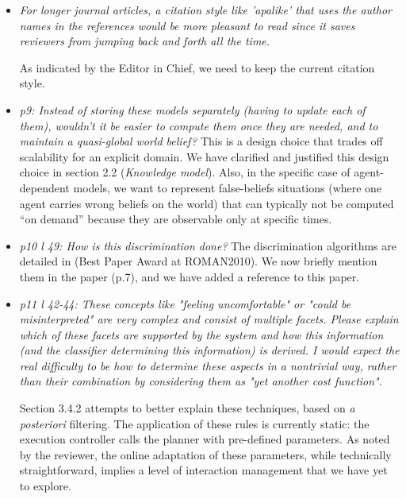 \documentclass{article}
\begin{document}
\begin{itemize}

    \item \emph{For longer journal articles, a citation style like 'apalike' that uses the
author names in the references would be more pleasant to read since it saves
reviewers from jumping back and forth all the time.}

As indicated by the Editor in Chief, we need to keep the current citation style.

    \item \emph{p9: Instead of storing these models separately (having to
    update each
of them), wouldn't it be easier to compute them once they are needed, and
to maintain a quasi-global world belief?} This is a design choice that trades
off scalability for an explicit domain. We have clarified and
justified this design choice in section 2.2 (\emph{Knowledge model}). Also, in
the specific case of agent-dependent models, we want to represent
false-beliefs situations (where one agent carries wrong beliefs on the world)
that can typically not be computed ``on demand'' because they are observable
only at specific times.

    \item \emph{p10 l 49: How is this discrimination done?} The discrimination
        algorithms are detailed in \cite{Ros2010b} (Best Paper Award at
        ROMAN2010). We now briefly mention them in the paper (p.7), and we have added a
        reference to this paper.

    \item \emph{p11 l 42-44: These concepts like "feeling uncomfortable" or "could be
      misinterpreted" are very complex and consist of multiple facets. Please
        explain which of these facets are supported by the system and how this
          information (and the classifier determining this information) is
          derived.
            I would expect the real difficulty to be how to determine these
            aspects in
              a nontrivial way, rather than their combination by considering
              them as "yet
          another cost function".}

          Section 3.4.2 attempts to better explain these techniques, based on
          \emph{a posteriori} filtering. The application of these rules is
          currently static: the execution controller calls the planner with
          pre-defined parameters. As noted by the reviewer, the online
          adaptation of these parameters, while technically straightforward,
          implies a level of interaction management that we have yet to
          explore.


\end{itemize}
\end{document}
